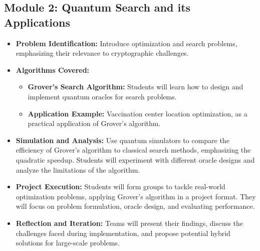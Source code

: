 \subsection{Module 2: Quantum Search and its Applications}

\begin{itemize}
    \item \textbf{Problem Identification:} Introduce optimization and search problems, emphasizing their relevance to cryptographic challenges.
    \item \textbf{Algorithms Covered:}
    \begin{itemize}
        \item \textbf{Grover’s Search Algorithm:} Students will learn how to design and implement quantum oracles for search problems.
        \item \textbf{Application Example:} Vaccination center location optimization, as a practical application of Grover’s algorithm.
    \end{itemize}
    \item \textbf{Simulation and Analysis:} Use quantum simulators to compare the efficiency of Grover’s algorithm to classical search methods, emphasizing the quadratic speedup. Students will experiment with different oracle designs and analyze the limitations of the algorithm.
    \item \textbf{Project Execution:} Students will form groups to tackle real-world optimization problems, applying Grover’s algorithm in a project format. They will focus on problem formulation, oracle design, and evaluating performance.
    \item \textbf{Reflection and Iteration:} Teams will present their findings, discuss the challenges faced during implementation, and propose potential hybrid solutions for large-scale problems.
\end{itemize}


